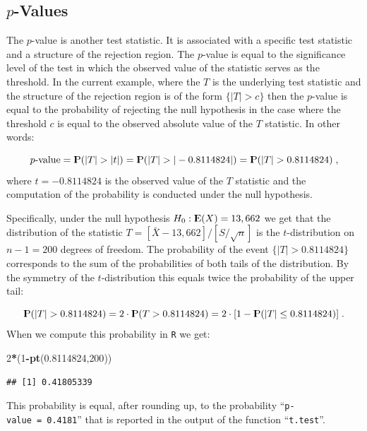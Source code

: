 \documentclass[]{krantz}
\makeatletter
\newenvironment{Shaded}{\begin{snugshade}}{\end{snugshade}}
\newcommand{\KeywordTok}[1]{\textcolor[rgb]{0.13,0.29,0.53}{\textbf{#1}}}
\newcommand{\DecValTok}[1]{\textcolor[rgb]{0.00,0.00,0.81}{#1}}
\newcommand{\FloatTok}[1]{\textcolor[rgb]{0.00,0.00,0.81}{#1}}
\newcommand{\OperatorTok}[1]{\textcolor[rgb]{0.81,0.36,0.00}{\textbf{#1}}}
\newcommand{\NormalTok}[1]{#1}
\newcommand{\Expec}{{\rm I\kern-.3em E}}
\newcommand{\Prob}{{\rm I\kern-.3em P}}
\newenvironment{kframe}{%
\medskip{}
\setlength{\fboxsep}{.8em}
 \def\at@end@of@kframe{}%
 \ifinner\ifhmode%
  \def\at@end@of@kframe{\end{minipage}}%
  \begin{minipage}{\columnwidth}%
 \fi\fi%
 \def\FrameCommand##1{\hskip\@totalleftmargin \hskip-\fboxsep
 \colorbox{shadecolor}{##1}\hskip-\fboxsep
     \hskip-\linewidth \hskip-\@totalleftmargin \hskip\columnwidth}%
 \MakeFramed {\advance\hsize-\width
   \@totalleftmargin\z@ \linewidth\hsize
   \@setminipage}}%
 {\par\unskip\endMakeFramed%
 \at@end@of@kframe}
\renewenvironment{Shaded}{\begin{kframe}}{\end{kframe}}
\theoremstyle{definition}
\theoremstyle{definition}
\theoremstyle{definition}
\theoremstyle{remark}
\makeatother
\begin{document}
\subsection{\texorpdfstring{\(p\)-Values}{p-Values}}\label{p-values}

The \(p\)-value is another test statistic. It is associated with a
specific test statistic and a structure of the rejection region. The
\(p\)-value is equal to the significance level of the test in which the
observed value of the statistic serves as the threshold. In the current
example, where the \(T\) is the underlying test statistic and the
structure of the rejection region is of the form \(\{|T| > c\}\) then
the \(p\)-value is equal to the probability of rejecting the null
hypothesis in the case where the threshold \(c\) is equal to the
observed absolute value of the \(T\) statistic. In other words:

\[\mbox{$p$-value} = \Prob(|T| > |t|) = \Prob(|T| > |-0.8114824|)= \Prob(|T| > 0.8114824)\;,\]
where \(t=-0.8114824\) is the observed value of the \(T\) statistic and
the computation of the probability is conducted under the null
hypothesis.

Specifically, under the null hypothesis \(H_0: \Expec(X) = 13,662\) we
get that the distribution of the statistic
\(T = [\bar X - 13,662]/[S/\sqrt{n}]\) is the \(t\)-distribution on
\(n-1 = 200\) degrees of freedom. The probability of the event
\(\{|T| > 0.8114824\}\) corresponds to the sum of the probabilities of
both tails of the distribution. By the symmetry of the
\(t\)-distribution this equals twice the probability of the upper tail:

\[\Prob(|T| > 0.8114824) = 2\cdot \Prob(T> 0.8114824) = 2\cdot [1-\Prob(|T| \leq 0.8114824)]\;.\]
When we compute this probability in \texttt{R} we get:

\begin{Shaded}
\begin{Highlighting}[]
\DecValTok{2}\OperatorTok{*}\NormalTok{(}\DecValTok{1}\OperatorTok{-}\KeywordTok{pt}\NormalTok{(}\FloatTok{0.8114824}\NormalTok{,}\DecValTok{200}\NormalTok{))}
\end{Highlighting}
\end{Shaded}

\begin{verbatim}
## [1] 0.41805339
\end{verbatim}

This probability is equal, after rounding up, to the probability
``\texttt{p-value\ =\ 0.4181}'' that is reported in the output of the
function ``\texttt{t.test}''.
\end{document}
